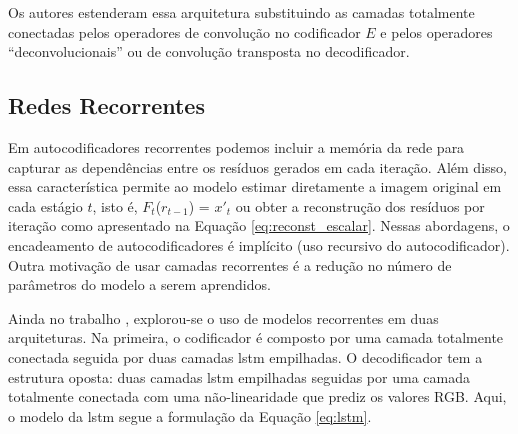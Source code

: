 Os autores estenderam essa arquitetura substituindo as camadas totalmente conectadas pelos operadores de convolução no codificador $E$ e pelos operadores ``deconvolucionais'' ou de convolução transposta no decodificador.





\subsection{Redes Recorrentes}



Em autocodificadores recorrentes podemos incluir a memória da rede para capturar as dependências entre os resíduos gerados em cada iteração. Além disso, essa característica permite ao modelo  estimar diretamente a imagem original em cada estágio $t$, isto é, $F_t$($r_{t-1}$) = $x'_{t}$ ou obter a reconstrução dos resíduos por iteração como apresentado na Equação \ref{eq:reconst_escalar}. 
Nessas abordagens, o encadeamento de autocodificadores é implícito (uso recursivo do autocodificador). Outra motivação de usar camadas recorrentes é a redução no número de parâmetros do modelo a serem aprendidos. 

Ainda no trabalho \cite{Variable2016Toderici}, explorou-se o uso de modelos recorrentes em duas arquiteturas. Na primeira, o codificador é composto por uma camada totalmente conectada seguida por duas camadas \acrshort{lstm} empilhadas. O decodificador tem a estrutura oposta: duas camadas \acrshort{lstm} empilhadas seguidas por uma camada totalmente conectada com uma não-linearidade que prediz os valores RGB. Aqui, o modelo da \acrshort{lstm} segue a formulação da Equação \ref{eq:lstm}.

